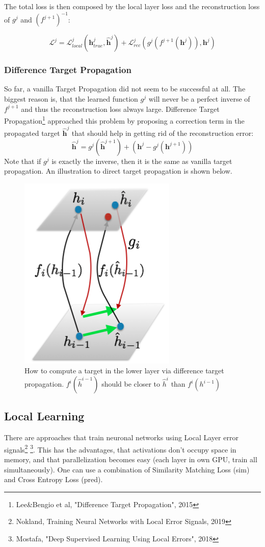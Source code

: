 \documentclass[main]{subfiles}
\begin{document}
The total loss is then composed by the local layer loss and the reconstruction loss of $g^j$ and $(f^{j+1})^{-1}$:

\begin{equation}
    \mathcal{L}^j = \mathcal{L}_{local}^j(\bm{h}_{true}^j, \bm{\hat{h}}^j) + \mathcal{L}_{rec}^j(g^j(f^{j+1}(\bm{h}^j)), \bm{h}^j)
\end{equation}

\subsubsection{Difference Target Propagation}
So far, a vanilla Target Propagation did not seem to be successful at all. The biggest reason is, that the learned function $g^j$ will never be a perfect inverse of $f^{j+1}$ and thus the reconstruction loss always large. Difference Target Propagation\footnote{Lee\&Bengio et al, "Difference Target Propagation", 2015} approached this problem by proposing a correction term in the propagated target $\bm{\hat{h}}^{j}$ that should help in getting rid of the reconstruction error:
%
\begin{equation}
    \bm{\hat{h}}^{j} = g^j(\bm{\hat{h}}^{j+1}) + (\bm{h}^{j} - g^j(\bm{h}^{j+1}))
\end{equation}
%
Note that if $g^j$ is exactly the inverse, then it is the same as vanilla target propagation. An illustration to direct target propagation is shown below.

\begin{figure}[H]
	\centering
	\includegraphics[width=0.45\linewidth]{02_TrainingMethodsForDeepANNs/figures/dtp.png}
	\caption{How to compute a target in the lower layer via difference target propagation. $f^i( \hat{h}^{i-1})$ should be closer to $\hat{h}^i$ than $f^i(h^{i-1})$}
	\label{fig:targetprop}
\end{figure}



\subsection{Local Learning}
There are approaches that train neuronal networks using Local Layer error signals\footnote{Nokland, Training Neural Networks with Local Error Signals, 2019} \footnote{Mostafa, "Deep Supervised Learning Using Local Errors", 2018}. This has the advantages, that activations don't occupy space in memory, and that parallelization becomes easy (each layer in own GPU, train all simultaneously). One can use a combination of Similarity Matching Loss (sim) and Cross Entropy Loss (pred).
\end{document}

